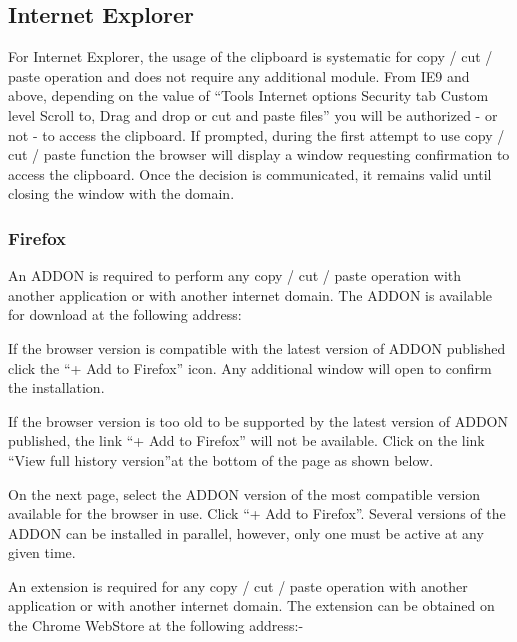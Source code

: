 \documentclass[letterpaper,10pt,english]{sphinxmanual}
\begin{document}
\subsection{Internet Explorer}
\label{\detokenize{User_Guide:internet-explorer}}
For Internet Explorer, the usage of the clipboard is systematic for copy / cut / paste operation and does not require any additional module.
From IE9 and above, depending on the value of “Tools \textbar{} Internet options \textbar{} Security tab \textbar{} Custom level \textbar{} Scroll to, Drag
and drop or cut and paste files” you will be authorized - or not - to access the clipboard. If prompted, during the first
attempt to use copy / cut / paste function the browser will display a window requesting confirmation to access the
clipboard. Once the decision is communicated, it remains valid until closing the window with the domain.


\subsubsection{Firefox}
\label{\detokenize{User_Guide:firefox}}
An ADDON is required to perform any copy / cut / paste operation with another application or with another internet
domain. The ADDON is available for download at the following address:


If the browser version is compatible with the latest version of ADDON published click the “+ Add to Firefox” icon. Any
additional window will open to confirm the installation.


If the browser version is too old to be supported by the latest version of ADDON published, the link “+ Add to Firefox”
will not be available. Click on the link “View full history version”at the bottom of the page as shown below.


On the next page, select the ADDON version of the most compatible version available for the browser in use. Click “+
Add to Firefox”. Several versions of the ADDON can be installed in parallel, however, only one must be active at any
given time.


An extension is required for any copy / cut / paste operation with another application or with another internet
domain. The extension can be obtained on the Chrome WebStore at the following address:-
\end{document}
